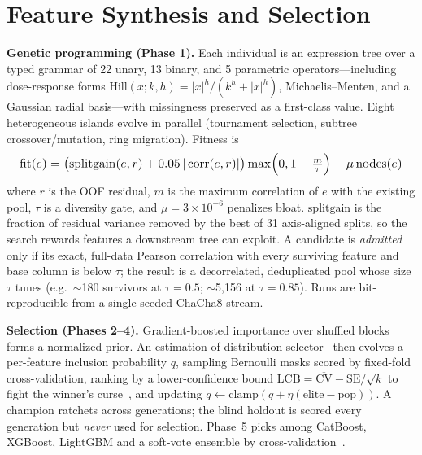 \documentclass[10pt,conference]{IEEEtran}
\providecommand{\corr}{\operatorname{corr}}
\begin{document}
\section{Feature Synthesis and Selection}\label{sec:method}
\textbf{Genetic programming (Phase 1).} Each individual is an expression tree over a typed
grammar of 22 unary, 13 binary, and 5 parametric operators---including dose-response forms
$\mathrm{Hill}(x;k,h)=|x|^{h}/(k^{h}+|x|^{h})$, Michaelis--Menten, and a Gaussian radial
basis---with missingness preserved as a first-class value. Eight heterogeneous islands evolve
in parallel (tournament selection, subtree crossover/mutation, ring migration). Fitness is
\begin{equation}
\resizebox{0.98\columnwidth}{!}{$\displaystyle
\mathrm{fit}(e)=\big(\mathrm{splitgain}(e,r)+0.05\,|\corr(e,r)|\big)\max\!\Big(0,1-\tfrac{m}{\tau}\Big)-\mu\,\mathrm{nodes}(e)$}
\label{eq:fit}
\end{equation}
where $r$ is the OOF residual, $m$ is the maximum correlation of $e$ with the existing pool,
$\tau$ is a diversity gate, and $\mu=3\times10^{-6}$ penalizes bloat. $\mathrm{splitgain}$ is
the fraction of residual variance removed by the best of 31 axis-aligned splits, so the search
rewards features a downstream tree can exploit. A candidate is \emph{admitted} only if its
exact, full-data Pearson correlation with every surviving feature and base column is below
$\tau$; the result is a decorrelated, deduplicated pool whose size $\tau$ tunes (e.g.\ $\sim$180
survivors at $\tau{=}0.5$; $\sim$5{,}156 at $\tau{=}0.85$). Runs are bit-reproducible from a
single seeded ChaCha8 stream.

\textbf{Selection (Phases 2--4).} Gradient-boosted importance over shuffled blocks forms a
normalized prior. An estimation-of-distribution selector~\cite{koza1992,real2020} then evolves
a per-feature inclusion probability $q$, sampling Bernoulli masks scored by fixed-fold
cross-validation, ranking by a lower-confidence bound
$\mathrm{LCB}=\overline{\mathrm{CV}}-\mathrm{SE}/\sqrt{k}$ to fight the winner's
curse~\cite{tsamardinos2018}, and updating $q\leftarrow\mathrm{clamp}(q+\eta(\mathrm{elite}-\mathrm{pop}))$.
A champion ratchets across generations; the blind holdout is scored every generation but
\emph{never} used for selection. Phase~5 picks among CatBoost, XGBoost, LightGBM and a
soft-vote ensemble by cross-validation~\cite{catboost2018,chen2016,ke2017,autogluon2020}.
\end{document}
